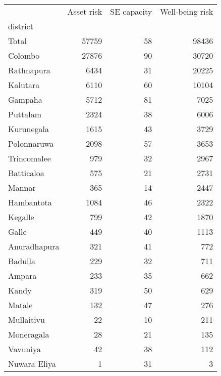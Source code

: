 \begin{tabular}{lrrr}
\toprule
{} &  Asset risk &  SE capacity &  Well-being risk \\
district     &             &              &                  \\
\midrule
Total        &       57759 &           58 &            98436 \\
Colombo      &       27876 &           90 &            30720 \\
Rathnapura   &        6434 &           31 &            20225 \\
Kalutara     &        6110 &           60 &            10104 \\
Gampaha      &        5712 &           81 &             7025 \\
Puttalam     &        2324 &           38 &             6006 \\
Kurunegala   &        1615 &           43 &             3729 \\
Polonnaruwa  &        2098 &           57 &             3653 \\
Trincomalee  &         979 &           32 &             2967 \\
Batticaloa   &         575 &           21 &             2731 \\
Mannar       &         365 &           14 &             2447 \\
Hambantota   &        1084 &           46 &             2322 \\
Kegalle      &         799 &           42 &             1870 \\
Galle        &         449 &           40 &             1113 \\
Anuradhapura &         321 &           41 &              772 \\
Badulla      &         229 &           32 &              711 \\
Ampara       &         233 &           35 &              662 \\
Kandy        &         319 &           50 &              629 \\
Matale       &         132 &           47 &              276 \\
Mullaitivu   &          22 &           10 &              211 \\
Moneragala   &          28 &           21 &              135 \\
Vavuniya     &          42 &           38 &              112 \\
Nuwara Eliya &           1 &           31 &                3 \\
\bottomrule
\end{tabular}

